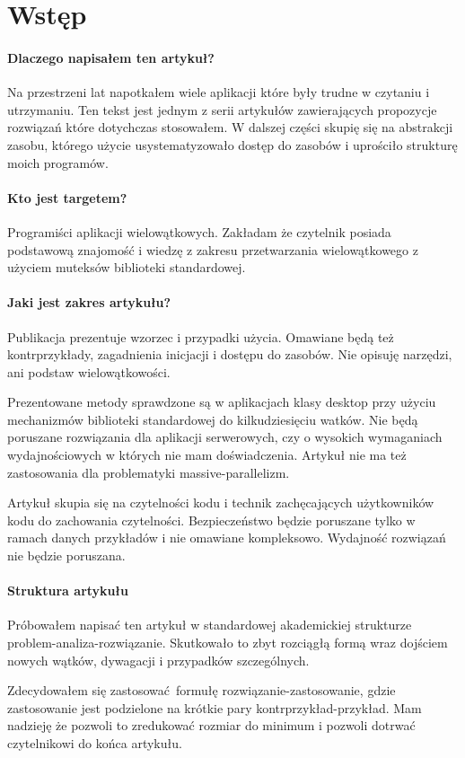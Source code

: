 \section{Wstęp}\label{sec:introduction}
\paragraph{Dlaczego napisałem ten artykuł?}
Na przestrzeni lat napotkałem wiele aplikacji które były trudne w czytaniu i utrzymaniu. Ten tekst jest jednym z serii artykułów zawierających propozycje rozwiązań które dotychczas stosowałem.
W dalszej części skupię się na abstrakcji zasobu, którego użycie usystematyzowało dostęp do zasobów i uprościło strukturę moich programów.

\paragraph{Kto jest targetem?}
Programiści \Cpp{} aplikacji wielowątkowych. Zakładam że czytelnik posiada podstawową znajomość  i wiedzę z zakresu przetwarzania wielowątkowego z użyciem muteksów biblioteki standardowej.

\paragraph{Jaki jest zakres artykułu?}
Publikacja prezentuje wzorzec  i przypadki użycia. Omawiane będą też kontrprzykłady, zagadnienia inicjacji i dostępu do zasobów.  Nie opisuję narzędzi, ani podstaw wielowątkowości.

Prezentowane metody sprawdzone są w aplikacjach klasy desktop przy użyciu mechanizmów biblioteki standardowej do kilkudziesięciu watków. Nie będą poruszane rozwiązania dla aplikacji serwerowych, czy o wysokich wymaganiach wydajnościowych w których nie mam doświadczenia. Artykuł nie ma też zastosowania dla problematyki massive-parallelizm.

Artykuł skupia się na czytelności kodu i technik zachęcających użytkowników kodu do zachowania czytelności. Bezpieczeństwo będzie poruszane tylko w ramach danych przykładów i nie omawiane kompleksowo. Wydajność rozwiązań nie będzie poruszana.

\paragraph{Struktura artykułu}
Próbowałem napisać ten artykuł w standardowej akademickiej strukturze problem-analiza-rozwiązanie. Skutkowało to zbyt rozciągłą formą wraz dojściem nowych wątków, dywagacji i przypadków szczególnych.

Zdecydowałem się zastosować formułę rozwiązanie-zastosowanie, gdzie zastosowanie jest podzielone na krótkie pary kontrprzykład-przykład. Mam nadzieję że pozwoli to zredukować rozmiar do minimum i pozwoli dotrwać czytelnikowi do końca artykułu.
